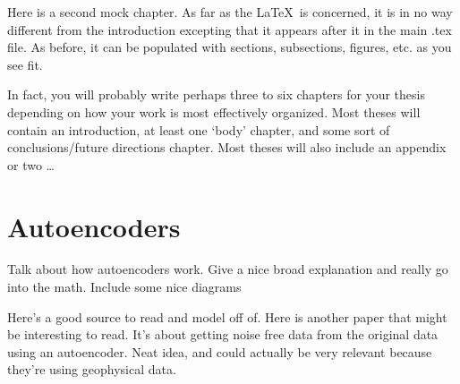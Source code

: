 
Here is a second mock chapter.  As far as the \LaTeX ~is concerned, it is in no way different from the introduction excepting that it appears after it in the main .tex file.  As before, it can be populated with sections, subsections, figures, etc. as you see fit.

In fact, you will probably write perhaps three to six chapters for your thesis depending on how your work is most effectively organized.  Most theses will contain an introduction, at least one `body' chapter, and some sort of conclusions/future directions chapter.  Most theses will also include an appendix or two \ldots

\section{Autoencoders}
Talk about how autoencoders work. Give a nice broad explanation and really go into the math. Include some nice diagrams

Here's \cite{ng2011sparse} a good source to read and model off of. Here \cite{Bhowick2019} is another paper that might be interesting to read. It's about getting noise free data from the original data using an autoencoder. Neat idea, and could actually be very relevant because they're using geophysical data.